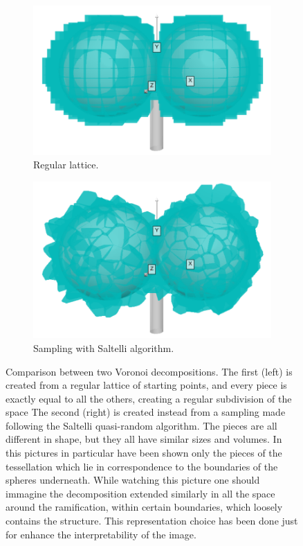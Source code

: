     \begin{figure}
        \centering
        \begin{subfigure}[b]{0.45\textwidth}
             \centering
             \includegraphics[width = \textwidth]{images/reg_vor}
             \caption{Regular lattice.}
             \label{fig:reg_vor}
        \end{subfigure}
        \hfill
        \begin{subfigure}[b]{0.45\textwidth}
             \centering
             \includegraphics[width = \textwidth]{images/sal_vor}
             \caption{Sampling with Saltelli algorithm.}
             \label{fig:sal_vor}
        \end{subfigure}
        \caption{Comparison between two Voronoi decompositions. The first (left) is created from a regular lattice of starting points, and every piece is exactly equal to all the others, creating a regular subdivision of the space The second (right) is created instead from a sampling made following the Saltelli quasi-random algorithm. The pieces are all different in shape, but they all have similar sizes and volumes. In this pictures in particular have been shown only the pieces of the tessellation which lie in correspondence to the boundaries of the spheres underneath. While watching this picture one should immagine the decomposition extended similarly in all the space around the ramification, within certain boundaries, which loosely contains the structure. This representation choice has been done just for enhance the interpretability of the image. }
        \label{fig:vor_comp}
    \end{figure}

